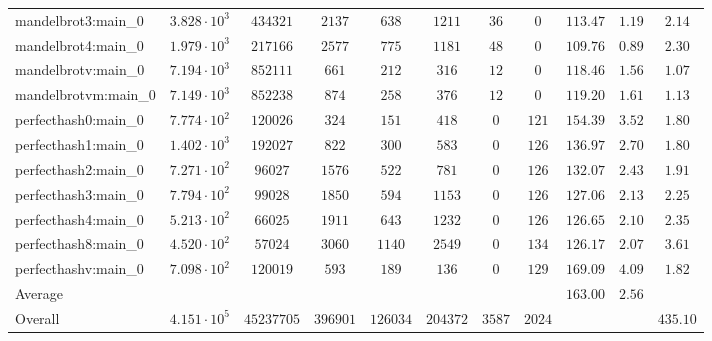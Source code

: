 \begin{tabular}{|l|c|c|c|c|c|c|c|c|c|c|}
mandelbrot3:main\_0            & $ 3.828 \cdot 10^{3} $ & $ 434321   $ & $ 2137   $ & $ 638    $ & $ 1211   $ & $ 36   $ & $ 0    $ & $ 113.47      $ & $ 1.19    $ & $ 2.14    $ \\
mandelbrot4:main\_0            & $ 1.979 \cdot 10^{3} $ & $ 217166   $ & $ 2577   $ & $ 775    $ & $ 1181   $ & $ 48   $ & $ 0    $ & $ 109.76      $ & $ 0.89    $ & $ 2.30    $ \\
mandelbrotv:main\_0            & $ 7.194 \cdot 10^{3} $ & $ 852111   $ & $ 661    $ & $ 212    $ & $ 316    $ & $ 12   $ & $ 0    $ & $ 118.46      $ & $ 1.56    $ & $ 1.07    $ \\
mandelbrotvm:main\_0           & $ 7.149 \cdot 10^{3} $ & $ 852238   $ & $ 874    $ & $ 258    $ & $ 376    $ & $ 12   $ & $ 0    $ & $ 119.20      $ & $ 1.61    $ & $ 1.13    $ \\
perfecthash0:main\_0           & $ 7.774 \cdot 10^{2} $ & $ 120026   $ & $ 324    $ & $ 151    $ & $ 418    $ & $ 0    $ & $ 121  $ & $ 154.39      $ & $ 3.52    $ & $ 1.80    $ \\
perfecthash1:main\_0           & $ 1.402 \cdot 10^{3} $ & $ 192027   $ & $ 822    $ & $ 300    $ & $ 583    $ & $ 0    $ & $ 126  $ & $ 136.97      $ & $ 2.70    $ & $ 1.80    $ \\
perfecthash2:main\_0           & $ 7.271 \cdot 10^{2} $ & $ 96027    $ & $ 1576   $ & $ 522    $ & $ 781    $ & $ 0    $ & $ 126  $ & $ 132.07      $ & $ 2.43    $ & $ 1.91    $ \\
perfecthash3:main\_0           & $ 7.794 \cdot 10^{2} $ & $ 99028    $ & $ 1850   $ & $ 594    $ & $ 1153   $ & $ 0    $ & $ 126  $ & $ 127.06      $ & $ 2.13    $ & $ 2.25    $ \\
perfecthash4:main\_0           & $ 5.213 \cdot 10^{2} $ & $ 66025    $ & $ 1911   $ & $ 643    $ & $ 1232   $ & $ 0    $ & $ 126  $ & $ 126.65      $ & $ 2.10    $ & $ 2.35    $ \\
perfecthash8:main\_0           & $ 4.520 \cdot 10^{2} $ & $ 57024    $ & $ 3060   $ & $ 1140   $ & $ 2549   $ & $ 0    $ & $ 134  $ & $ 126.17      $ & $ 2.07    $ & $ 3.61    $ \\
perfecthashv:main\_0           & $ 7.098 \cdot 10^{2} $ & $ 120019   $ & $ 593    $ & $ 189    $ & $ 136    $ & $ 0    $ & $ 129  $ & $ 169.09      $ & $ 4.09    $ & $ 1.82    $ \\
\hline
Average                        & $                    $ & $          $ & $        $ & $        $ & $        $ & $      $ & $      $ & $ 163.00      $ & $ 2.56    $ & $         $ \\
\hline
Overall                        & $ 4.151 \cdot 10^{5} $ & $ 45237705 $ & $ 396901 $ & $ 126034 $ & $ 204372 $ & $ 3587 $ & $ 2024 $ & $             $ & $         $ & $ 435.10  $ \\
\hline
\end{tabular}
